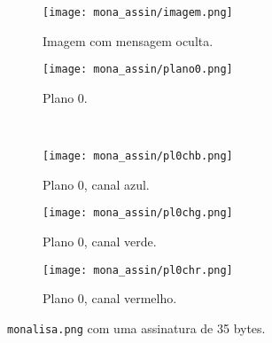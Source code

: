 \begin{figure}[H]
    \centering
    \begin{subfigure}{0.4\textwidth}
        \centering
        \texttt{[image: mona\_assin/imagem.png]}
        \caption{Imagem com mensagem oculta.}
        \label{fig:assinatura:imagem}
    \end{subfigure}%
    \begin{subfigure}{0.4\textwidth}
        \centering
        \texttt{[image: mona\_assin/plano0.png]}
        \caption{Plano 0.}
        \label{fig:assinatura:plano}
    \end{subfigure}\\[8pt]
    \begin{subfigure}{0.28\textwidth}
        \centering
        \texttt{[image: mona\_assin/pl0chb.png]}
        \caption{Plano 0, canal azul.}
        \label{fig:assinatura:blue}
    \end{subfigure}%
    \begin{subfigure}{0.28\textwidth}
        \centering
        \texttt{[image: mona\_assin/pl0chg.png]}
        \caption{Plano 0, canal verde.}
        \label{fig:assinatura:green}
    \end{subfigure}%
    \begin{subfigure}{0.28\textwidth}
        \centering
        \texttt{[image: mona\_assin/pl0chr.png]}
        \caption{Plano 0, canal vermelho.}
        \label{fig:assinatura:red}
    \end{subfigure}%

    \caption{\texttt{monalisa.png} com uma assinatura de 35 bytes.}
    \label{fig:assinatura}
\end{figure}